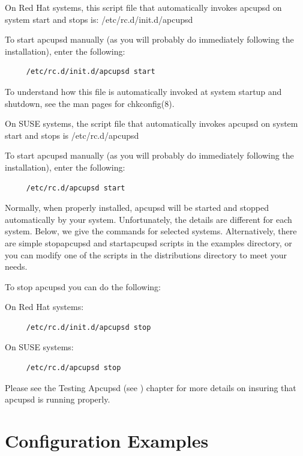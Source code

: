 On Red Hat systems, this script file that automatically invokes apcupsd on
system start and stops is: /etc/rc.d/init.d/apcupsd  

To start apcupsd manually (as you will probably do immediately following the
installation), enter the following: 

\footnotesize
\begin{verbatim}
     /etc/rc.d/init.d/apcupsd start
\end{verbatim}
\normalsize

To understand how this file is automatically invoked at system startup and
shutdown, see the man pages for chkconfig(8).  

On SUSE systems, the script file that automatically invokes apcupsd on system
start and stops is /etc/rc.d/apcupsd  

To start apcupsd manually (as you will probably do immediately following the
installation), enter the following: 

\footnotesize
\begin{verbatim}
     /etc/rc.d/apcupsd start
\end{verbatim}
\normalsize

Normally, when properly installed, apcupsd will be started and stopped
automatically by your system. Unfortunately, the details are different for
each system. Below, we give the commands for selected systems. Alternatively,
there are simple stopapcupsd and startapcupsd scripts in the examples
directory, or you can modify one of the scripts in the distributions directory
to meet your needs.  

To stop apcupsd you can do the following:  

On Red Hat systems: 

\footnotesize
\begin{verbatim}
     /etc/rc.d/init.d/apcupsd stop
\end{verbatim}
\normalsize

On SUSE systems: 

\footnotesize
\begin{verbatim}
     /etc/rc.d/apcupsd stop
\end{verbatim}
\normalsize

Please see the Testing Apcupsd (see 
) chapter for more details
on insuring that apcupsd is running properly. 

\label{Configuration-Examples}

\section*{Configuration Examples}

